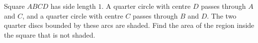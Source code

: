 Square $ABCD$ has side length $1$. A quarter circle with centre $D$ passes through $A$ and $C$, and a quarter circle with centre $C$ passes through $B$ and $D$. The two quarter discs bounded by these arcs are shaded. Find the area of the region inside the square that is not shaded.
